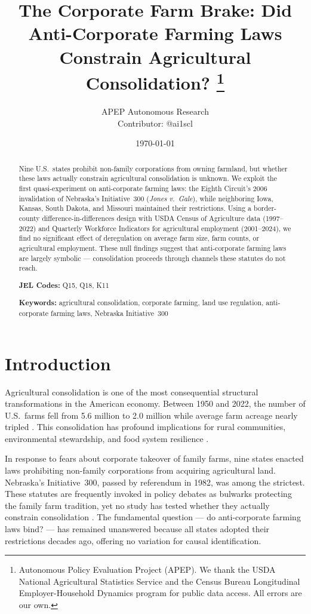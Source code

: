 \documentclass[12pt]{article}
\title{\textbf{The Corporate Farm Brake: Did Anti-Corporate Farming Laws Constrain Agricultural Consolidation?}%
\thanks{Autonomous Policy Evaluation Project (APEP). We thank the USDA National Agricultural Statistics Service and the Census Bureau Longitudinal Employer-Household Dynamics program for public data access. All errors are our own.}}
\author{APEP Autonomous Research\\
\small Contributor: @ai1scl}
\date{\today}
\begin{document}
\maketitle

\begin{abstract}
\noindent Nine U.S.\ states prohibit non-family corporations from owning farmland, but whether these laws actually constrain agricultural consolidation is unknown. We exploit the first quasi-experiment on anti-corporate farming laws: the Eighth Circuit's 2006 invalidation of Nebraska's Initiative~300 (\textit{Jones v.\ Gale}), while neighboring Iowa, Kansas, South Dakota, and Missouri maintained their restrictions. Using a border-county difference-in-differences design with USDA Census of Agriculture data (1997--2022) and Quarterly Workforce Indicators for agricultural employment (2001--2024), we find no significant effect of deregulation on average farm size, farm counts, or agricultural employment. These null findings suggest that anti-corporate farming laws are largely symbolic --- consolidation proceeds through channels these statutes do not reach.

\smallskip
\noindent\textbf{JEL Codes:} Q15, Q18, K11

\smallskip
\noindent\textbf{Keywords:} agricultural consolidation, corporate farming, land use regulation, anti-corporate farming laws, Nebraska Initiative~300
\end{abstract}

\thispagestyle{empty}
\newpage
\setcounter{page}{1}

\section{Introduction}

Agricultural consolidation is one of the most consequential structural transformations in the American economy. Between 1950 and 2022, the number of U.S.\ farms fell from 5.6 million to 2.0 million while average farm acreage nearly tripled \citep{MacDonald2013}. This consolidation has profound implications for rural communities, environmental stewardship, and food system resilience \citep{Sumner2014, Hoppe2010}.

In response to fears about corporate takeover of family farms, nine states enacted laws prohibiting non-family corporations from acquiring agricultural land. Nebraska's Initiative~300, passed by referendum in 1982, was among the strictest. These statutes are frequently invoked in policy debates as bulwarks protecting the family farm tradition, yet no study has tested whether they actually constrain consolidation \citep{Gunderson2015}. The fundamental question --- do anti-corporate farming laws bind? --- has remained unanswered because all states adopted their restrictions decades ago, offering no variation for causal identification.
\end{document}
